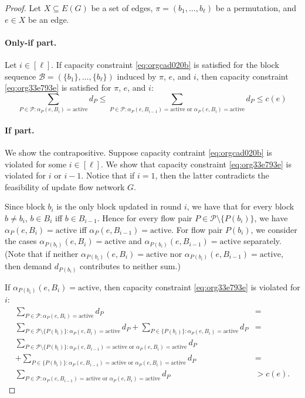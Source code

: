 \documentclass[fontsize=11pt,paper=a4]{book}
\begin{document}
\begin{proof}
Let \(X\subseteq E(G)\) be a set of edges, \(\pi=(b_1,\dots,b_{\ell})\) be a permutation, and \(e\in X\) be an edge.

\paragraph{Only-if part.}
Let \(i\in[\ell]\).
If capacity constraint \ref{eq:orgcad020b} is satisfied for the block sequence \(\mathcal{B}=(\{b_1\},\dots,\{b_{\ell}\})\) induced by \(\pi\), \(e\), and \(i\), then capacity constraint \ref{eq:org33e793e} is satisfied for \(\pi\), \(e\), and \(i\):
\[
\sum_{P\in\mathcal{P}:\alpha_P(e,B_i)=\mathrm{active}}d_P\leq\sum_{P\in\mathcal{P}:\alpha_P(e,B_{i-1})=\mathrm{active}\text{ or }\alpha_P(e,B_i)=\mathrm{active}}d_P\leq c(e)
\]

\paragraph{If part.}
We show the contrapositive.
Suppose capacity contraint \ref{eq:orgcad020b} is violated for some \(i\in[\ell]\).
We show that capacity constraint \ref{eq:org33e793e} is violated for \(i\) or \(i-1\).
Notice that if \(i=1\), then the latter contradicts the feasibility of update flow network \(G\).

Since block \(b_i\) is the only block updated in round \(i\), we have that for every block \(b\neq b_i\), \(b\in B_i\) iff \(b\in B_{i-1}\).
Hence for every flow pair \(P\in\mathcal{P}\setminus\{P(b_i)\}\), we have \(\alpha_P(e,B_i)=\mathrm{active}\) iff \(\alpha_P(e,B_{i-1})=\mathrm{active}\).
For flow pair \(P(b_i)\), we consider the cases \(\alpha_{P(b_i)}(e,B_i)=\mathrm{active}\) and \(\alpha_{P(b_i)}(e,B_{i-1})=\mathrm{active}\) separately.
(Note that if neither \(\alpha_{P(b_i)}(e,B_i)=\mathrm{active}\) nor \(\alpha_{P(b_i)}(e,B_{i-1})=\mathrm{active}\), then demand \(d_{P(b_i)}\) contributes to neither sum.)

If \(\alpha_{P(b_i)}(e,B_i)=\mathrm{active}\), then capacity constraint \ref{eq:org33e793e} is violated for \(i\):
\begin{align*}
\sum_{P\in\mathcal{P}:\alpha_P(e,B_i)=\mathrm{active}}d_P&=\\
\sum_{P\in\mathcal{P}\setminus\{P(b_i)\}:\alpha_P(e,B_i)=\mathrm{active}}d_P+\sum_{P\in\{P(b_i)\}:\alpha_P(e,B_i)=\mathrm{active}}d_P&=\\
\sum_{P\in\mathcal{P}\setminus\{P(b_i)\}:\alpha_P(e,B_{i-1})=\mathrm{active}\text{ or }\alpha_P(e,B_i)=\mathrm{active}}d_P&\\
+\sum_{P\in\{P(b_i)\}:\alpha_P(e,B_{i-1})=\mathrm{active}\text{ or }\alpha_P(e,B_i)=\mathrm{active}}d_P&=\\
\sum_{P\in\mathcal{P}:\alpha_P(e,B_{i-1})=\mathrm{active}\text{ or }\alpha_P(e,B_i)=\mathrm{active}}d_P&>
c(e).
\end{align*}


\end{proof}
\end{document}
